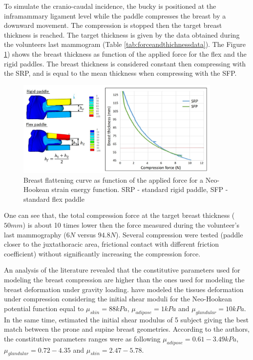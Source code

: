 To simulate the cranio-caudal incidence, the bucky is positioned at the inframammary ligament level while the paddle compresses the breast by a downward movement. The compression is stopped then the target breast thickness is reached. The target thickness is given by the data  obtained during the volunteers last mammogram (Table \ref{tab:forceandthichnessdata}). The Figure \ref{fig:thicknessforcerelationNH}) shows the breast thickness as function of the applied force for the flex and the rigid paddles. The breast thickness is considered constant then compressing with the SRP, and is equal to the mean thickness when compressing with the SFP. 
 
\begin{figure}[!h]
\centering
\includegraphics[width=0.9\textwidth,keepaspectratio]{figures/compressionforceNH.jpg} 
\caption{Breast flattening curve as function of the applied force for a Neo-Hookean strain energy function. SRP - standard rigid paddle, SFP -standard flex paddle}\label{fig:thicknessforcerelationNH}
\end{figure}

One can see that, the total compression force at the target breast thickness ($50mm$) is about 10 times lower then the force measured during the volunteer's last mammography ($6N$ versus $94.8N$). Several compression were tested (paddle closer to the juxtathoracic area, frictional contact with different friction coefficient) without significantly increasing the compression force. 

An analysis of the literature revealed that the constitutive parameters used for modeling the breast compression are higher than the ones used for modeling the breast deformation under gravity loading.  \cite{sturgeon_finite_element_2016}  have modeled the tissues deformation under compression considering the initial shear moduli for the Neo-Hookean potential function equal to $\mu_{skin} = 88kPa$, $\mu_{adipose} = 1kPa$ and $\mu_{glandular}= 10kPa$. In the same time, \cite{han_nonlinear_2014} estimated the initial shear modulus of 5 subject giving the best match between the prone and supine breast geometries. According to the authors, the constitutive parameters ranges were as following  $\mu_{adipose}=0.61-3.49 kPa$, $\mu_{glandular}=0.72-4.35$ and $\mu_{skin} = 2.47 - 5.78 $. 

